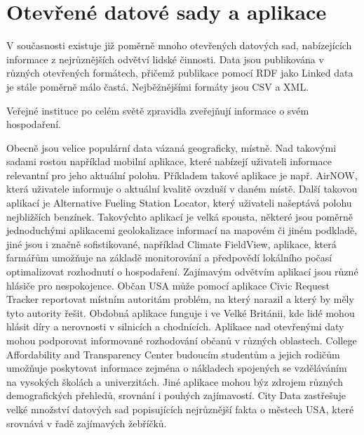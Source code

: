 \section{Otevřené datové sady a aplikace}


V současnosti existuje již poměrně mnoho otevřených datových sad, nabízejících informace z nejrůznějších odvětví lidské činnosti. Data jsou publikována v různých otevřených formátech, přičemž publikace pomocí RDF jako Linked data je stále poměrně málo častá. Nejběžnějšími formáty jsou CSV a XML.

Veřejné instituce po celém světě zpravidla zveřejňují informace o svém hospodaření.

Obecně jsou velice populární data vázaná geograficky, místně. Nad takovými sadami rostou například mobilní aplikace, které nabízejí uživateli informace relevantní pro jeho aktuální polohu. Příkladem takové aplikace je např. AirNOW, která uživatele informuje o aktuální kvalitě ovzduší v daném místě. Další takovou aplikací je Alternative Fueling Station Locator, který uživateli našeptává polohu nejbližších benzínek. Takovýchto aplikací je velká spousta, některé jsou poměrně jednoduchými aplikacemi geolokalizace informací na mapovém či jiném podkladě, jiné jsou i značně sofistikované, například Climate FieldView, aplikace, která farmářům umožňuje na základě monitorování a předpovědí lokálního počasí optimalizovat rozhodnutí o hospodaření.
Zajímavým odvětvím aplikací jsou různé hlásiče pro nespokojence. Občan USA může pomocí aplikace Civic Request Tracker reportovat místním autoritám problém, na který narazil a který by měly tyto autority řešit. Obdobná aplikace funguje i ve Velké Británii, kde lidé mohou hlásit díry a nerovnosti v silnicích a chodnících.
Aplikace nad otevřenými daty mohou podporovat informované rozhodování občanů v různých oblastech. College Affordability and Transparency Center budoucím studentům a jejich rodičům umožňuje poskytovat informace zejména o nákladech spojených se vzděláváním na vysokých školách a univerzitách.
Jiné aplikace mohou býz zdrojem různých demografických přehledů, srovnání i pouhých zajímavostí. City Data zastřešuje velké množství datových sad popisujících nejrůznější fakta o městech USA, které srovnává v řadě zajímavých žebříčků.

